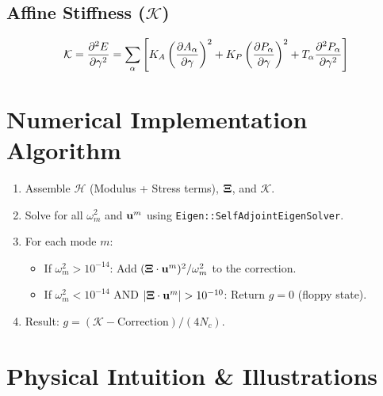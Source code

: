 \documentclass[12pt]{article}
\begin{document}
\subsection{Affine Stiffness ($\mathcal{K}$)}
\begin{equation}
    \mathcal{K} = \pdv[2]{E}{\gamma} = \sum_\alpha \left[ K_A \left(\pdv{A_\alpha}{\gamma}\right)^2 + K_P \left(\pdv{P_\alpha}{\gamma}\right)^2 + T_\alpha \pdv[2]{P_\alpha}{\gamma} \right]
\end{equation}

\section{Numerical Implementation Algorithm}

\begin{enumerate}
    \item Assemble $\mathcal{H}$ (Modulus + Stress terms), $\vb{\Xi}$, and $\mathcal{K}$.
    \item Solve for all $\omega_m^2$ and $\vb{u}^m$ using \texttt{Eigen::SelfAdjointEigenSolver}.
    \item For each mode $m$:
    \begin{itemize}
        \item If $\omega_m^2 > 10^{-14}$: Add $(\vb{\Xi} \cdot \vb{u}^m)^2 / \omega_m^2$ to the correction.
        \item If $\omega_m^2 < 10^{-14}$ AND $|\vb{\Xi} \cdot \vb{u}^m| > 10^{-10}$: Return $g = 0$ (floppy state).
    \end{itemize}
    \item Result: $g = (\mathcal{K} - \text{Correction}) / (4 N_c)$.
\end{enumerate}

\section{Physical Intuition \& Illustrations}
\end{document}
